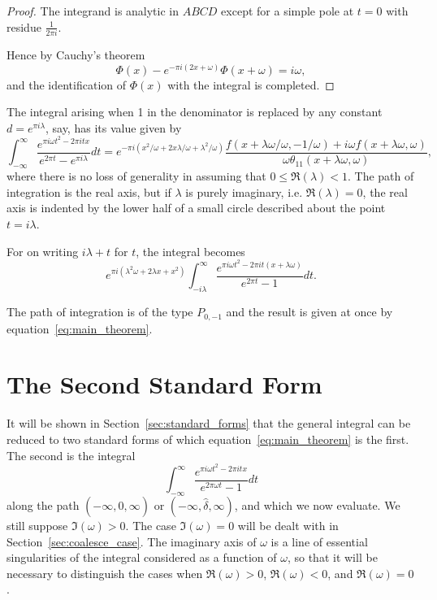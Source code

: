 \documentclass[12pt]{article}
\theoremstyle{remark}
\begin{document}
\begin{proof}
The integrand is analytic in $ABCD$ except for a simple pole at $t = 0$ with residue $\frac{1}{2\pi i}$.

Hence by Cauchy's theorem
\begin{equation}\label{eq:cauchy_result}
\Phi(x) - e^{-\pi i(2x+\omega)} \Phi(x+\omega) = i\omega,
\end{equation}
and the identification of $\Phi(x)$ with the integral is completed.
\end{proof}

The integral arising when 1 in the denominator is replaced by any constant $d = e^{\pi i\lambda}$, say, has its value given by
\begin{equation}\label{eq:general_constant}
\int_{-\infty}^\infty \frac{e^{\pi i\omega t^2 - 2\pi itx}}{e^{2\pi t} - e^{\pi i\lambda}} dt = e^{-\pi i(x^2/\omega + 2x\lambda/\omega + \lambda^2/\omega)} \frac{f(x + \lambda\omega/\omega, -1/\omega) + i\omega f(x + \lambda\omega, \omega)}{\omega \theta_{11}(x + \lambda\omega, \omega)},
\end{equation}
where there is no loss of generality in assuming that $0 \leq \Re(\lambda) < 1$. The path of integration is the real axis, but if $\lambda$ is purely imaginary, i.e. $\Re(\lambda) = 0$, the real axis is indented by the lower half of a small circle described about the point $t = i\lambda$.

For on writing $i\lambda + t$ for $t$, the integral becomes
\begin{equation}\label{eq:shifted_integral}
e^{\pi i(\lambda^2\omega + 2\lambda x + x^2)} \int_{-i\lambda}^\infty \frac{e^{\pi i\omega t^2 - 2\pi it(x+\lambda\omega)}}{e^{2\pi t} - 1} dt.
\end{equation}

The path of integration is of the type $P_{0,-1}$ and the result is given at once by equation~\eqref{eq:main_theorem}.

\section{The Second Standard Form}\label{sec:second_standard_form}

It will be shown in Section~\ref{sec:standard_forms} that the general integral can be reduced to two standard forms of which equation~\eqref{eq:main_theorem} is the first. The second is the integral
\begin{equation}\label{eq:second_standard}
\int_{-\infty}^\infty \frac{e^{\pi i\omega t^2 - 2\pi itx}}{e^{2\pi\omega t} - 1} dt
\end{equation}
along the path $(-\infty, \hat{0}, \infty)$ or $(-\infty, \hat{\delta}, \infty)$, and which we now evaluate. We still suppose $\Im(\omega) > 0$. The case $\Im(\omega) = 0$ will be dealt with in Section~\ref{sec:coalesce_case}. The imaginary axis of $\omega$ is a line of essential singularities of the integral considered as a function of $\omega$, so that it will be necessary to distinguish the cases when $\Re(\omega) > 0$, $\Re(\omega) < 0$, and $\Re(\omega) = 0$.
\end{document}
